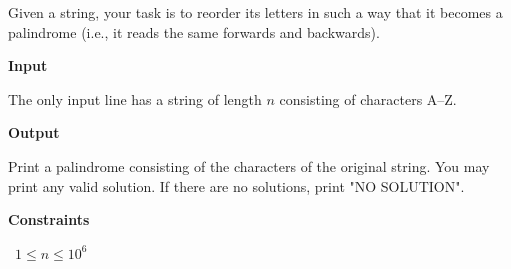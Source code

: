 Given a string, your task is to reorder its letters in such a way that it becomes a palindrome (i.e., it reads the same forwards and backwards).

\vspace{0.3cm}\noindent\textbf{Input}

The only input line has a string of length $n$ consisting of characters A–Z.

\vspace{0.3cm}\noindent\textbf{Output}

Print a palindrome consisting of the characters of the original string. You may print any valid solution. If there are no solutions, print "NO SOLUTION".

\vspace{0.3cm}\noindent\textbf{Constraints}

\textbullet\ $1 \le n \le 10^6$